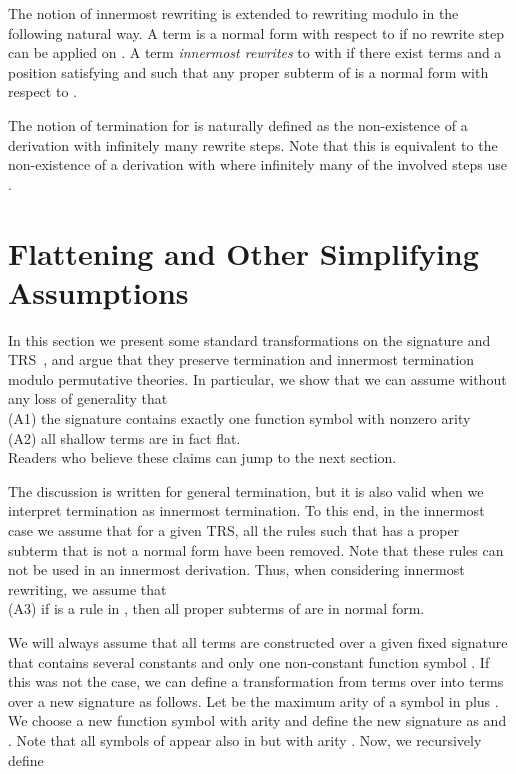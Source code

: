 \documentclass{LMCS}
\theoremstyle{plain}
\begin{document}
The notion of innermost rewriting is extended to rewriting
modulo in the following natural way. A term  is a normal
form with respect to  if no  rewrite step can
be applied on . A term  {\em{innermost rewrites}} to 
with  if there exist terms  and a position  satisfying
 and such that any proper subterm
of  is a normal form with respect to .

The notion of termination for  is naturally defined
as the non-existence of a  derivation with infinitely
many rewrite steps.
Note that this is equivalent to the non-existence of
a derivation with  where infinitely many
of the involved steps use .

\section{Flattening and Other Simplifying Assumptions}
\label{sec-flatten}

\noindent In this section we present some standard transformations
on the signature and TRS~\cite{GodoyTiwari05:CADE,DBLP:conf/rta/GodoyHT07}, 
and argue that they preserve
termination and innermost termination modulo permutative theories.
In particular, we show that we can assume without any loss of generality
that \\
(A1) the signature contains exactly one function symbol with nonzero arity
\\
(A2) all shallow terms are in fact flat.
\\
Readers who believe these claims can jump to the next section.

The discussion is
written for general termination, but it is also valid
when we interpret termination as innermost termination.
To this end, in the innermost case we assume that
for a given TRS, all the rules 
such that  has a proper subterm that is not a normal
form have been removed. Note that these rules can not
be used in an innermost derivation.
Thus, when considering innermost rewriting, we assume that
\\
(A3) if  is a rule in , then all
proper subterms of  are in normal form.

We will always assume that all terms
are constructed over a given fixed signature
 that contains several constants and
only one non-constant function symbol .
If this was not the case,
we can define a transformation  from
terms over  into terms over a new signature 
as follows. Let  be the
maximum arity of a symbol in  plus . We choose
a new function symbol  with arity  and define the new
signature  as
 and .
Note that all symbols of  appear also in 
but with arity .
Now, we recursively define
\end{document}
